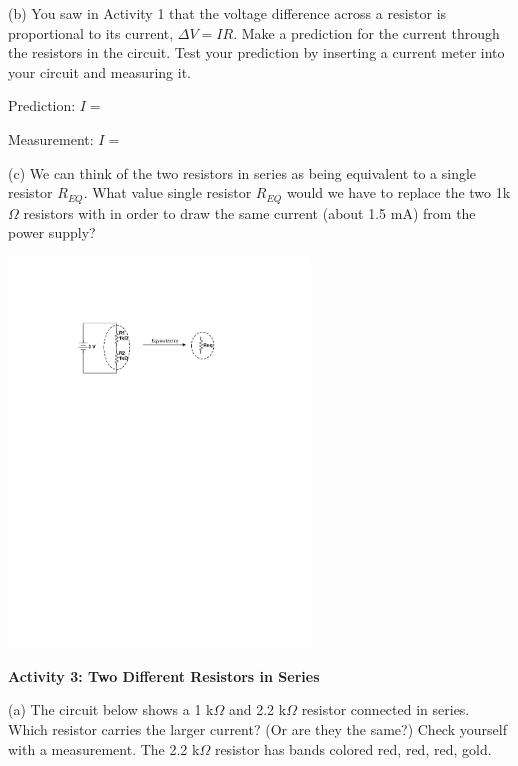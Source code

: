 (b) You saw in Activity 1 that the voltage difference across a resistor is proportional to its current, $\Delta V=IR$.  Make a prediction for the current through the resistors in the circuit.  Test your prediction by inserting a current meter into your circuit and measuring it.  

\vspace{0.2 in}
\hspace{0.4 in} Prediction: \hspace{0.4 in} $I =$ 
\vspace{0.2 in}

\hspace{0.4 in} Measurement: \hspace{0.2 in} $I=$ 
\answerspace{0.2 in}

\pagebreak[2]
(c) We can think of the two resistors in series as being equivalent to a single resistor $R_{EQ}$.  What value single resistor $R_{EQ}$ would we have to replace the two 1k$\Omega$ resistors with in order to draw the same current (about 1.5 mA) from the power supply? \par
\nopagebreak
\hspace{0.5in}
\includegraphics[width=0.6\textwidth]{electric_circuits2/circ_diag3_bw.pdf}
\vspace{0.1 in}

\textbf{Activity 3: Two Different Resistors in Series} \par
\nopagebreak
(a) The circuit below shows a 1 k$\Omega$ and 2.2 k$\Omega$ resistor connected in series.  Which resistor carries the larger current? (Or are they the same?)  Check yourself with a measurement.   The 2.2 k$\Omega$ resistor has bands colored red, red, red, gold.

